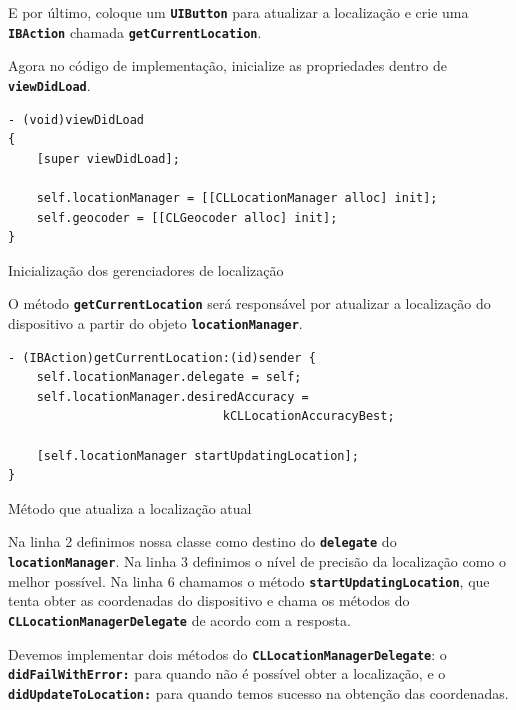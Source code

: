 \documentclass[a4paper,12pt,brazil,doubleside]{book}
\begin{document}
\begin{singlespace}
E por último, coloque um \texttt{\textbf{UIButton}} para atualizar a localização e crie uma \texttt{\textbf{IBAction}} chamada \texttt{\textbf{getCurrentLocation}}.

Agora no código de implementação, inicialize as propriedades dentro de \texttt{\textbf{viewDidLoad}}.

\begin{listing}[H]
\begin{verbatim}
- (void)viewDidLoad
{
    [super viewDidLoad];
    
    self.locationManager = [[CLLocationManager alloc] init];
    self.geocoder = [[CLGeocoder alloc] init];
}
\end{verbatim}
\caption{Inicialização dos gerenciadores de localização}
\end{listing}


O método \texttt{\textbf{getCurrentLocation}} será responsável por atualizar a localização do dispositivo a partir do objeto \texttt{\textbf{locationManager}}.

\begin{listing}[H]
\begin{verbatim}
- (IBAction)getCurrentLocation:(id)sender {
    self.locationManager.delegate = self;
    self.locationManager.desiredAccuracy =
                              kCLLocationAccuracyBest;
    
    [self.locationManager startUpdatingLocation];
}
\end{verbatim}
\caption{Método que atualiza a localização atual}
\end{listing}


Na linha 2 definimos nossa classe como destino do \texttt{\textbf{delegate}} do \texttt{\textbf{locationManager}}. Na linha 3 definimos o nível de precisão da localização como o melhor possível. Na linha 6 chamamos o método \texttt{\textbf{startUpdatingLocation}}, que tenta obter as coordenadas do dispositivo e chama os métodos do \texttt{\textbf{CLLocationManagerDelegate}} de acordo com a resposta.

Devemos implementar dois métodos do \texttt{\textbf{CLLocationManagerDelegate}}: o\\ \texttt{\textbf{didFailWithError:}} para quando não é possível obter a localização, e o\\ \texttt{\textbf{didUpdateToLocation:}} para quando temos sucesso na obtenção das coordenadas.


\end{singlespace}
\end{document}
